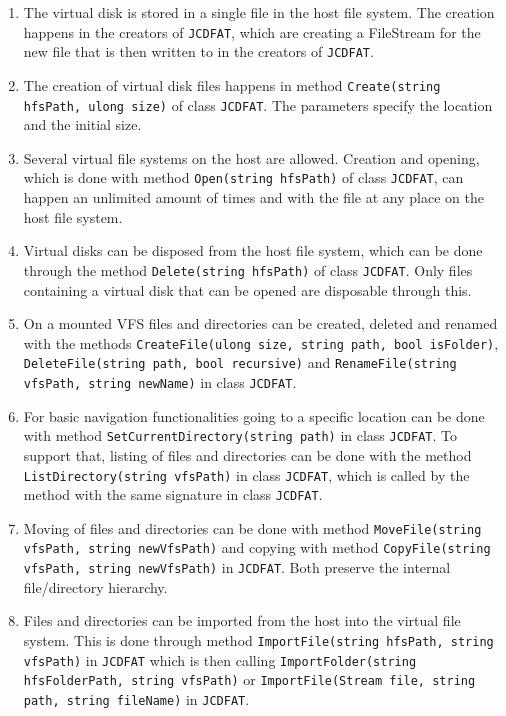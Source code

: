 \documentclass[a4paper,12pt]{article}
\begin{document}
\begin{enumerate}
	\item The virtual disk is stored in a single file in the host file system. The creation happens in the creators of \texttt{JCDFAT}, which are creating a FileStream for the new file that is then written to in the creators of \texttt{JCDFAT}.
	\item The creation of virtual disk files happens in method \texttt{Create(string hfsPath, ulong size)} of class \texttt{JCDFAT}. The parameters specify the location and the initial size.
	\item Several virtual file systems on the host are allowed. Creation and opening, which is done with method \texttt{Open(string hfsPath)} of class \texttt{JCDFAT}, can happen an unlimited amount of times and with the file at any place on the host file system.
	\item Virtual disks can be disposed from the host file system, which can be done through the method \texttt{Delete(string hfsPath)} of class \texttt{JCDFAT}. Only files containing a virtual disk that can be opened are disposable through this.
	\item On a mounted VFS files and directories can be created, deleted and renamed with the methods \texttt{CreateFile(ulong size, string path, bool isFolder)}, \texttt{DeleteFile(string path, bool recursive)} and \texttt{RenameFile(string vfsPath, string newName)} in class \texttt{JCDFAT}.
	\item For basic navigation functionalities going to a specific location can be done with method \texttt{SetCurrentDirectory(string path)} in class \texttt{JCDFAT}. To support that, listing of files and directories can be done with the method \texttt{ListDirectory(string vfsPath)} in class \texttt{JCDFAT}, which is called by the method with the same signature in class \texttt{JCDFAT}.
	\item Moving of files and directories can be done with method \texttt{MoveFile(string vfsPath, string newVfsPath)} and copying with method \newline
	\texttt{CopyFile(string vfsPath, string newVfsPath)} in \texttt{JCDFAT}. Both preserve the internal file/directory hierarchy.
	\item Files and directories can be imported from the host into the virtual file system. This is done through method \texttt{ImportFile(string hfsPath, string vfsPath)} in \texttt{JCDFAT} which is then calling \texttt{ImportFolder(string hfsFolderPath, string vfsPath)} or \texttt{ImportFile(Stream file, string path, string fileName)} in \texttt{JCDFAT}.

\end{enumerate}
\end{document}
